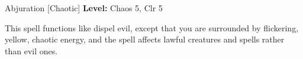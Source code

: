 {Abjuration [Chaotic]}
{
	\textbf{Level:}
	Chaos 5, Clr 5\\
}
{
	This spell functions like dispel evil, except that you are surrounded by flickering, yellow, chaotic energy, and the spell affects lawful creatures and spells rather than evil ones.

}
